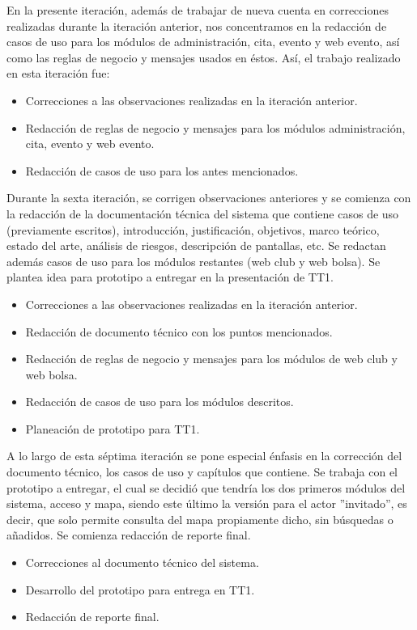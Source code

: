 \noindent
En la presente iteración, además de trabajar de nueva cuenta en correcciones realizadas durante la iteración anterior, nos concentramos en la redacción de casos de uso para los módulos de administración, cita, evento y web evento, así como las reglas de negocio y mensajes usados en éstos. Así, el trabajo realizado en esta iteración fue:
\begin{itemize}
	\item Correcciones a las observaciones realizadas en la iteración anterior. 
	\item Redacción de reglas de negocio y mensajes para los módulos administración, cita, evento y web evento.
	\item Redacción de casos de uso para los antes mencionados.
\end{itemize}

\noindent
Durante la sexta iteración, se corrigen observaciones anteriores y se comienza con la redacción de la documentación técnica del sistema que contiene casos de uso (previamente escritos), introducción, justificación, objetivos, marco teórico, estado del arte, análisis de riesgos, descripción de pantallas, etc. Se redactan además casos de uso para los módulos restantes (web club y web bolsa). Se plantea idea para prototipo a entregar en la presentación de TT1. 
\begin{itemize}
	\item Correcciones a las observaciones realizadas en la iteración anterior. 
	\item Redacción de documento técnico con los puntos mencionados.
	\item Redacción de reglas de negocio y mensajes para los módulos de web club y web bolsa.
	\item Redacción de casos de uso para los módulos descritos. 
	\item Planeación de prototipo para TT1. 
\end{itemize}

\noindent
A lo largo de esta séptima iteración se pone especial énfasis en la corrección del documento técnico, los casos de uso y capítulos que contiene. Se trabaja con el prototipo a entregar, el cual se decidió que tendría los dos primeros módulos del sistema, acceso y mapa, siendo este último la versión para el actor ''invitado'', es decir, que solo permite consulta del mapa propiamente dicho, sin búsquedas o añadidos. Se comienza redacción de reporte final. 
\begin{itemize}
	\item Correcciones al documento técnico del sistema.
	\item Desarrollo del prototipo para entrega en TT1.
	\item Redacción de reporte final. 
\end{itemize}

